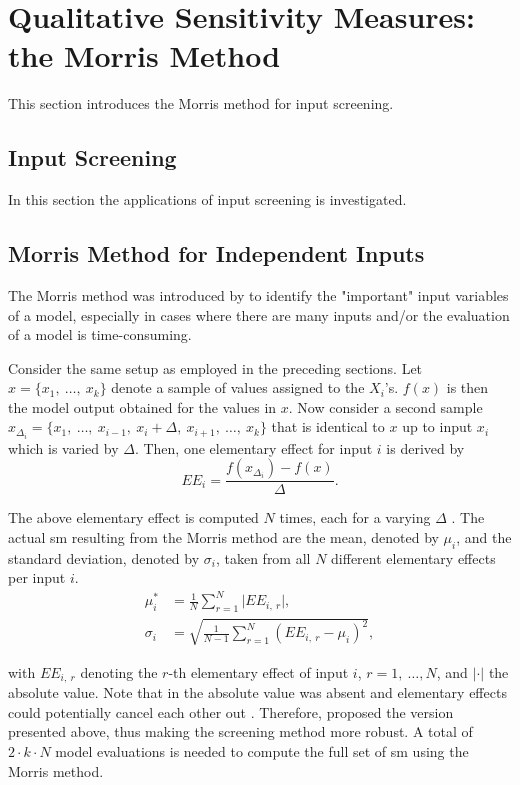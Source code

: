 \section{Qualitative Sensitivity Measures: the Morris Method}

This section introduces the Morris method for input screening.

\subsection{Input Screening}

In this section the applications of input screening is investigated.

% 

\subsection{Morris Method for Independent Inputs} \label{classic_morris}

The Morris method was introduced by \citet{M91} to identify the "important" input variables of a model, especially in cases where there are many inputs and/or the evaluation of a model is time-consuming.

Consider the same setup as employed in the preceding sections. Let $x = \{x_1,\ \dots,\ x_k\}$ denote a sample of values assigned to the $X_i$'s. $f(x)$ is then the model output obtained for the values in $x$. Now consider a second sample $x_{\Delta_i} = \{x_1,\ \dots,\ x_{i-1},\ x_i + \Delta,\ x_{i+1},\ \dots,\ x_k\}$ that is identical to $x$ up to input $x_i$ which is varied by $\Delta$. Then, one elementary effect for input $i$ is derived by
\begin{equation}
EE_i = \frac{f(x_{\Delta_i}) - f(x)}{\Delta}.
\end{equation}

The above elementary effect is computed $N$ times, each for a varying $\Delta$ \citep{GM17}. The actual sm resulting from the Morris method are the mean, denoted by $\mu_i$, and the standard deviation, denoted by $\sigma_i$, taken from all $N$ different elementary effects per input $i$.
\begin{align}
\mu_i^\ast& = \frac{1}{N} \sum_{r=1}^N \vert EE_{i,\ r} \vert, \label{mu}\\
\sigma_i& = \sqrt{\frac{1}{N-1} \sum_{r=1}^N (EE_{i,\ r} - \mu_i)^2}, \label{sigma}
\end{align}

\noindent with $EE_{i,\ r}$ denoting the $r$-th elementary effect of input $i$, $r = 1,\ \dots, N$, and $\vert \cdot \vert$ the absolute value. Note that in \citet{M91} the absolute value was absent and elementary effects could potentially cancel each other out \citep{CCS07}. Therefore, \citet{CCS07} proposed the version presented above, thus making the screening method more robust. A total of $2 \cdot k \cdot N$ model evaluations is needed to compute the full set of sm using the Morris method.

